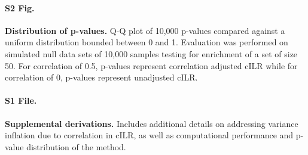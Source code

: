 \documentclass[10pt,letterpaper]{article}
\begin{document}
\paragraph*{S2 Fig.}
\label{S2_Fig}
{\bf Distribution of p-values.} Q-Q plot of 10,000 p-values compared against a uniform distribution bounded between 0 and 1. Evaluation was performed on simulated null data sets of 10,000 samples testing for enrichment of a set of size 50. For correlation of 0.5, p-values represent correlation adjusted cILR while for correlation of 0, p-values represent unadjusted cILR. 

\paragraph*{S1 File.}
\label{S1_File}
{\bf Supplemental derivations.} Includes additional details on addressing variance inflation due to correlation in cILR, as well as computational performance and p-value distribution of the method.   
\end{document}
